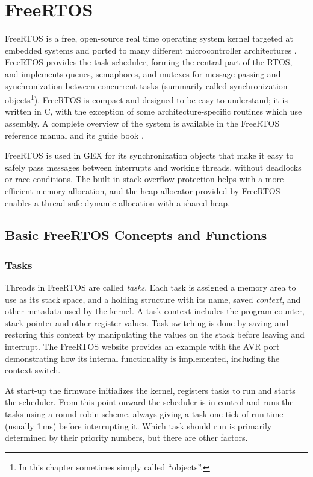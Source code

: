 \chapter{FreeRTOS} \label{sec:freertos}

FreeRTOS is a free, open-source real time operating system kernel targeted at embedded systems and ported to many different microcontroller architectures \cite{freertos-ports-list}. FreeRTOS provides the task scheduler, forming the central part of the RTOS, and implements queues, semaphores, and mutexes for message passing and synchronization between concurrent tasks (summarily called synchronization objects\footnote{In this chapter sometimes simply called ``objects''.}). FreeRTOS is compact and designed to be easy to understand; it is written in C, with the exception of some architecture-specific routines which use assembly. A complete overview of the system is available in the FreeRTOS reference manual \cite{freertos-rm} and its guide book \cite{freertos-book}.

FreeRTOS is used in GEX for its synchronization objects that make it easy to safely pass messages between interrupts and working threads, without deadlocks or race conditions. The built-in stack overflow protection helps with a more efficient memory allocation, and the heap allocator provided by FreeRTOS enables a thread-safe dynamic allocation with a shared heap.

\section{Basic FreeRTOS Concepts and Functions}

\subsection{Tasks}

Threads in FreeRTOS are called \textit{tasks}. Each task is assigned a memory area to use as its stack space, and a holding structure with its name, saved \textit{context}, and other metadata used by the kernel. A task context includes the program counter, stack pointer and other register values. Task switching is done by saving and restoring this context by manipulating the values on the stack before leaving and interrupt. The FreeRTOS website provides an example with the AVR port \cite{freertos-task-switching} demonstrating how its internal functionality is implemented, including the context switch.

At start-up the firmware initializes the kernel, registers tasks to run and starts the scheduler. From this point onward the scheduler is in control and runs the tasks using a round robin scheme, always giving a task one tick of run time (usually 1\,ms) before interrupting it. Which task should run is primarily determined by their priority numbers, but there are other factors.

